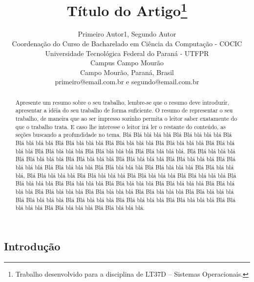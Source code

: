 \documentclass[times, 10pt,twocolumn]{article}
\begin{document}
\begin{savenotes}
\title{Título do Artigo\footnote{Trabalho desenvolvido para a disciplina de LT37D – Sistemas Operacionais.}}


\author{Primeiro Autor1, Segundo Autor\\
Coordenação do Curso de Bacharelado em Ciência da Computação - COCIC\\
Universidade Tecnológica Federal do Paraná - UTFPR\\ 
Campus Campo Mourão\\
Campo Mourão, Paraná, Brasil\\
primeiro@email.com.br e segundo@email.com.br\\
}

\maketitle
\thispagestyle{empty}

\begin{abstract}
   Apresente um resumo sobre o seu trabalho, lembre-se que o resumo deve introduzir, apresentar a idéia do seu trabalho de forma suficiente. O resumo de representar o seu trabalho, de maneira que ao ser impresso sozinho permita o leitor saber exatamente do que o trabalho trata. E caso lhe interesse o leitor irá ler o restante do conteúdo, as seções buscando a profundidade no tema.
   Blá Blá blá blá blá Blá Blá blá blá blá Blá Blá blá blá blá Blá Blá blá blá blá Blá Blá blá blá blá Blá Blá blá blá blá Blá Blá blá blá blá Blá Blá blá blá blá Blá Blá blá blá blá Blá Blá blá blá blá. Blá Blá blá blá blá Blá Blá blá blá blá Blá Blá blá blá blá Blá Blá blá blá blá Blá Blá blá blá blá Blá Blá blá blá blá Blá Blá blá blá blá Blá Blá blá blá blá Blá Blá blá blá blá Blá Blá blá blá blá, Blá Blá blá blá blá Blá Blá blá blá blá Blá Blá blá blá blá Blá Blá blá blá blá Blá Blá blá blá blá Blá Blá blá blá blá Blá Blá blá blá blá Blá Blá blá blá blá Blá Blá blá blá blá Blá Blá blá blá blá Blá Blá blá blá blá Blá Blá blá blá blá Blá Blá blá blá blá Blá Blá blá blá blá Blá Blá blá blá blá Blá Blá blá blá blá Blá Blá blá blá blá Blá Blá blá blá blá Blá Blá blá blá blá Blá Blá blá blá blá.
\end{abstract}
\section{Introdução} \label{sec_introducao}


\end{savenotes}
\end{document}
